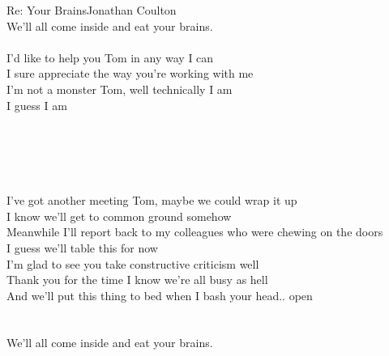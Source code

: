 \documentclass[a4paper,11pt]{article}
\begin{document}
\begin{song}{Re: Your Brains}{Jonathan Coulton}
\\
We'll all come inside and eat your brains.\\
\\
I'd like to help you Tom in any way I can\\
I sure appreciate the way you're working with me\\
I'm not a monster Tom, well technically I am\\
I guess I am\\
\\
\\
\\
\\
\\
 I've got another meeting Tom, maybe we could wrap it up \\
I know we'll get to common ground somehow \\
Meanwhile I'll report back to my colleagues who were chewing on the doors\\
 I guess we'll table this for now\\
I'm glad to see  you take constructive criticism well\\
Thank you for the time I know we're all busy as hell\\
And we'll put this thing to bed  when I bash your head.. open\\
\\
\\
We'll all come inside and eat your brains.\\


\end{song}
\end{document}
